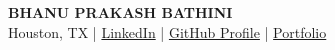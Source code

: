 \begin{center}
  {\Huge\bfseries\color{HEADINGBLUE} BHANU PRAKASH BATHINI}\\[4pt]
  {\normalsize Houston, TX \quad|\quad
   \href{https://www.linkedin.com/}{LinkedIn} \quad|\quad
   \href{https://github.com/}{GitHub Profile} \quad|\quad
   \href{https://portfolio.dev/}{Portfolio}}
\end{center}

\vspace{-8pt}
